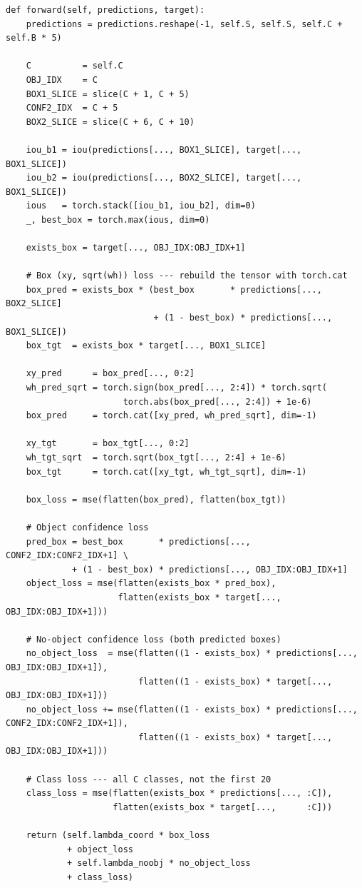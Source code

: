 \begin{lstlisting}[caption={Fixed body of \texttt{YoloLoss.forward}.},
label=lst:loss-fixed]
def forward(self, predictions, target):
    predictions = predictions.reshape(-1, self.S, self.S, self.C + self.B * 5)

    C          = self.C
    OBJ_IDX    = C
    BOX1_SLICE = slice(C + 1, C + 5)
    CONF2_IDX  = C + 5
    BOX2_SLICE = slice(C + 6, C + 10)

    iou_b1 = iou(predictions[..., BOX1_SLICE], target[..., BOX1_SLICE])
    iou_b2 = iou(predictions[..., BOX2_SLICE], target[..., BOX1_SLICE])
    ious   = torch.stack([iou_b1, iou_b2], dim=0)
    _, best_box = torch.max(ious, dim=0)

    exists_box = target[..., OBJ_IDX:OBJ_IDX+1]

    # Box (xy, sqrt(wh)) loss --- rebuild the tensor with torch.cat
    box_pred = exists_box * (best_box       * predictions[..., BOX2_SLICE]
                             + (1 - best_box) * predictions[..., BOX1_SLICE])
    box_tgt  = exists_box * target[..., BOX1_SLICE]

    xy_pred      = box_pred[..., 0:2]
    wh_pred_sqrt = torch.sign(box_pred[..., 2:4]) * torch.sqrt(
                       torch.abs(box_pred[..., 2:4]) + 1e-6)
    box_pred     = torch.cat([xy_pred, wh_pred_sqrt], dim=-1)

    xy_tgt       = box_tgt[..., 0:2]
    wh_tgt_sqrt  = torch.sqrt(box_tgt[..., 2:4] + 1e-6)
    box_tgt      = torch.cat([xy_tgt, wh_tgt_sqrt], dim=-1)

    box_loss = mse(flatten(box_pred), flatten(box_tgt))

    # Object confidence loss
    pred_box = best_box       * predictions[..., CONF2_IDX:CONF2_IDX+1] \
             + (1 - best_box) * predictions[..., OBJ_IDX:OBJ_IDX+1]
    object_loss = mse(flatten(exists_box * pred_box),
                      flatten(exists_box * target[..., OBJ_IDX:OBJ_IDX+1]))

    # No-object confidence loss (both predicted boxes)
    no_object_loss  = mse(flatten((1 - exists_box) * predictions[..., OBJ_IDX:OBJ_IDX+1]),
                          flatten((1 - exists_box) * target[...,      OBJ_IDX:OBJ_IDX+1]))
    no_object_loss += mse(flatten((1 - exists_box) * predictions[..., CONF2_IDX:CONF2_IDX+1]),
                          flatten((1 - exists_box) * target[...,      OBJ_IDX:OBJ_IDX+1]))

    # Class loss --- all C classes, not the first 20
    class_loss = mse(flatten(exists_box * predictions[..., :C]),
                     flatten(exists_box * target[...,      :C]))

    return (self.lambda_coord * box_loss
            + object_loss
            + self.lambda_noobj * no_object_loss
            + class_loss)
\end{lstlisting}

